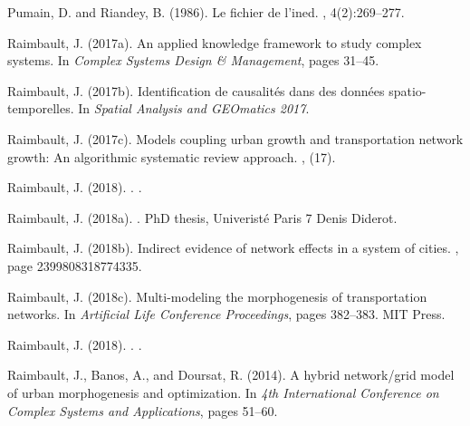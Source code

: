 \documentclass[11pt]{article}
\begin{document}
\begin{thebibliography}{}
Pumain, D. and Riandey, B. (1986).
\newblock Le fichier de l'ined.
, 4(2):269--277.

Raimbault, J. (2017a).
\newblock An applied knowledge framework to study complex systems.
\newblock In {\em Complex Systems Design \& Management}, pages 31--45.

Raimbault, J. (2017b).
\newblock Identification de causalit{\'e}s dans des donn{\'e}es
  spatio-temporelles.
\newblock In {\em Spatial Analysis and GEOmatics 2017}.

Raimbault, J. (2017c).
\newblock Models coupling urban growth and transportation network growth: An
  algorithmic systematic review approach.
, (17).

{Raimbault}, J. (2018).
.
.

Raimbault, J. (2018a).
.
\newblock PhD thesis, Univerist{\'e} Paris 7 Denis Diderot.

Raimbault, J. (2018b).
\newblock Indirect evidence of network effects in a system of cities.
,
  page 2399808318774335.

Raimbault, J. (2018c).
\newblock Multi-modeling the morphogenesis of transportation networks.
\newblock In {\em Artificial Life Conference Proceedings}, pages 382--383. MIT
  Press.

{Raimbault}, J. (2018).
.
.

Raimbault, J., Banos, A., and Doursat, R. (2014).
\newblock A hybrid network/grid model of urban morphogenesis and optimization.
\newblock In {\em 4th International Conference on Complex Systems and
  Applications}, pages 51--60.


\end{thebibliography}
\end{document}
